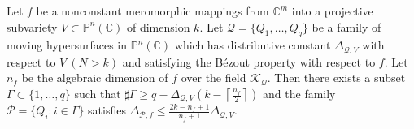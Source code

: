 \documentclass[10pt,a4paper]{amsart}
\newcommand{\C}{{\mathbb{C}}}
\renewcommand{\P}{{\mathbb{P}}}
\begin{document}
\begin{lemma}\label{4.1}
Let $f$ be a nonconstant meromorphic mappings from $\C^m$ into a projective subvariety $V\subset\P^n(\C)$ of dimension $k$. Let $\mathcal{Q} = \{Q_1, \ldots, Q_q\}$ be a family of moving hypersurfaces in $\P^n(\C)$ which has distributive constant $\Delta_{\mathcal Q,V}$ with respect to $V\ (N> k)$ and satisfying the B\'ezout property with respect to $f$. Let $n_f$ be the algebraic dimension of $f$ over the field $\mathcal K_{\mathcal Q}$. Then there exists a subset $\Gamma \subset \{1,\ldots,q\}$ such that $\sharp\Gamma\ge q -\Delta_{\mathcal Q,V}\left(k-\left\lceil\frac{n_f}{2}\right\rceil\right)$ and the family $\mathcal P= \{Q_i : i \in \Gamma\}$ satisfies $\Delta_{\mathcal P,f}\le \frac{2k-n_f+1}{n_f+1}\Delta_{\mathcal Q,V}$.
\end{lemma}
\end{document}
